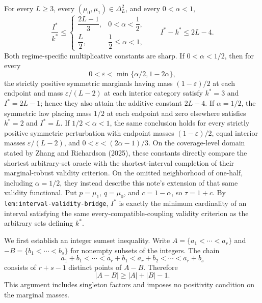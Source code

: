 For every \(L\geq3\), every \((\mu_0,\mu_1)\in\Delta_L^2\), and every \(0<\alpha<1\),
\[
\frac{I^*}{k^*}\leq
\begin{cases}
\dfrac{2L-1}{3},&0<\alpha<\dfrac12,\\[3pt]
\dfrac L2,&\dfrac12\leq\alpha<1,
\end{cases}
\qquad
I^*-k^*\leq2L-4.
\]
Both regime-specific multiplicative constants are sharp.  If \(0<\alpha<1/2\), then for every
\[
0<\varepsilon<\min\{\alpha/2,1-2\alpha\},
\]
the strictly positive symmetric marginals having mass \((1-\varepsilon)/2\) at each endpoint and mass \(\varepsilon/(L-2)\) at each interior category satisfy \(k^*=3\) and \(I^*=2L-1\); hence they also attain the additive constant \(2L-4\).  If \(\alpha=1/2\), the symmetric law placing mass \(1/2\) at each endpoint and zero elsewhere satisfies \(k^*=2\) and \(I^*=L\).  If \(1/2<\alpha<1\), the same conclusion holds for every strictly positive symmetric perturbation with endpoint masses \((1-\varepsilon)/2\), equal interior masses \(\varepsilon/(L-2)\), and \(0<\varepsilon<(2\alpha-1)/3\).  On the coverage-level domain stated by Zhang and Richardson (2025), these constants directly compare the shortest arbitrary-set oracle with the shortest-interval completion of their marginal-robust validity criterion.  On the omitted neighborhood of one-half, including \(\alpha=1/2\), they instead describe this note's extension of that same validity functional.
Put \(p=\mu_1\), \(q=\mu_0\), and \(c=1-\alpha\), so \(\tau=1+c\).  By \texttt{lem:interval-validity-bridge}, \(I^*\) is exactly the minimum cardinality of an interval satisfying the same every-compatible-coupling validity criterion as the arbitrary sets defining \(k^*\).

We first establish an integer sumset inequality.  Write \(A=\{a_1<\cdots<a_r\}\) and \(-B=\{b_1<\cdots<b_s\}\) for nonempty subsets of the integers.  The chain
\[
a_1+b_1<\cdots<a_r+b_1<a_r+b_2<\cdots<a_r+b_s
\]
consists of \(r+s-1\) distinct points of \(A-B\).  Therefore
\[
|A-B|\geq |A|+|B|-1.
\tag{1}
\]
This argument includes singleton factors and imposes no positivity condition on the marginal masses.

